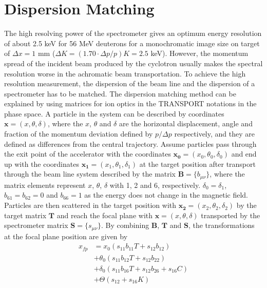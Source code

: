 \section{Dispersion Matching}
The high resolving power of the  spectrometer gives an optimum energy resolution of about 2.5 keV for  56 MeV deuterons  for a monochromatic image size on target of $\Delta  x = 1$ mm ($\Delta K=(1.70\cdot \Delta p/p)K = 2.5$ keV). However, the momentum spread of the incident beam produced by the cyclotron usually makes the spectral resolution worse in the achromatic beam transportation. To achieve the high resolution measurement, the dispersion of the beam line and the dispersion of a spectrometer has to be  matched.
The dispersion matching method can be explained by using matrices for ion optics in the TRANSPORT notations in the phase space. A particle in the system can be described by coordinates $\boldsymbol{x}=(x, \theta, \delta)$, where the $x$, $\theta$ and $\delta$ are the horizontal displacement, angle and fraction of the momentum deviation defined by $p/\Delta p$ respectively,  and they are defined as differences from the central trajectory.
Assume particles pass through the exit point of the accelerator with the coordinates $\boldsymbol{x_0}=(x_0, \theta_0, \delta_0)$ and end up with the coordinates $\boldsymbol{x_1} =(x_1, \theta_1, \delta_1)$ at the target position after transport through the beam line system  described by the matrix $\textbf{B}=\{b_{\mu \nu}\}$, where the matrix elements represent $x$, $\theta$, $\delta$ with 1, 2 and 6, respectively. $\delta_0=\delta_1$, $b_{61}=b_{62}=0$ and $b_{66}=1$ as the energy does not change in the magnetic field.
Particles are then scattered in the target position with $\boldsymbol{x_2}=(x_2, \theta_2, \delta_2)$ by the target matrix $\textbf{T}$ and reach the focal plane with $\boldsymbol{x}=(x, \theta, \delta)$ transported by the spectrometer matrix $\textbf{S}=\{s_{\mu \nu}\}$. By combining $\textbf{B}$, $\textbf{T}$ and $\textbf{S}$, the transformations at the focal plane position are given by
\begin{equation}
    \label{eq:x_fp}
    \begin{aligned}
     x_{fp} & =  x_0(s_{11} b_{11} T + s_{12} b_{12})               \\
            & + \theta_0(s_{11} b_{12} T + s_{12} b_{22})          \\
            & + \delta_0(s_{11} b_{16} T + s_{12} b_{26} + s_{16} C)  \\
            & + \Theta(s_{12} + s_{16} K)                           \\
    \end{aligned}
\end{equation}
